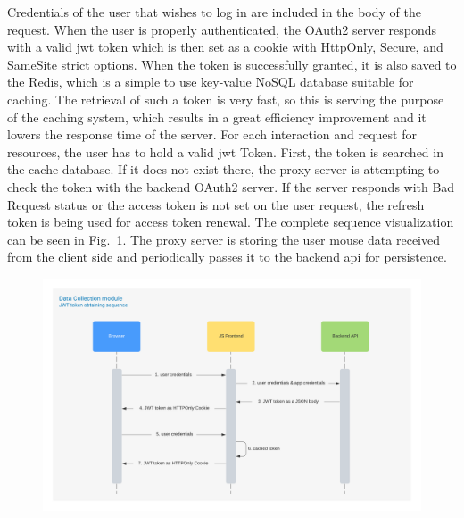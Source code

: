 Credentials of the user that wishes to log in are included in the body of the request.
When the user is properly authenticated, the OAuth2 server responds with a valid \gls{jwt} token which is then set as a cookie with HttpOnly, Secure, and SameSite strict options.
When the token is successfully granted, it is also saved to the Redis, which is a simple to use key-value NoSQL database suitable for caching.
The retrieval of such a token is very fast, so this is serving the purpose of the caching system, which results in a great efficiency improvement and it lowers the response time of the server.
For each interaction and request for resources, the user has to hold a valid \gls{jwt} Token.
First, the token is searched in the cache database.
If it does not exist there, the proxy server is attempting to check the token with the backend OAuth2 server.
If the server responds with Bad Request status or the access token is not set on the user request, the refresh token is being used for access token renewal.
The complete sequence visualization can be seen in \mbox{Fig.~\ref{fig:jwt-sequence}}.
The proxy server is storing the user mouse data received from the client side and periodically passes it to the backend \gls{api} for persistence.




\begin{figure}[!hbt]
    
    \centering
    \includegraphics[width=\linewidth]{resources/jwt_sequence_diagram.png}
    \captionsetup{width=\linewidth}
    \label{fig:jwt-sequence}
\end{figure}